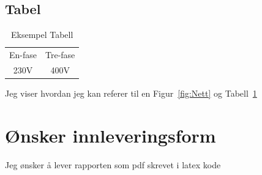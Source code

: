 \documentclass{article}
\begin{document}
\subsection{Tabel}

\begin{table}[H]
    \centering
    \begin{tabular}{cc}
        En-fase & Tre-fase\\
        230V & 400V\\
    \end{tabular}
    \caption{Eksempel Tabell}
    \label{tab:Tabel}
\end{table}

Jeg viser hvordan jeg kan referer til en Figur~\ref{fig:Nett} og Tabell~\ref{tab:Tabel}

\section{Ønsker innleveringsform}
Jeg ønsker å lever rapporten som pdf skrevet i latex kode
\end{document}

